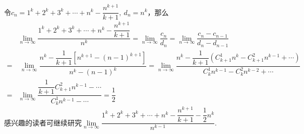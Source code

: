 \begin{itemize}[leftmargin=\inteval{\myitemleftmargin}pt,itemsep=
   \inteval{\myitemitempsep}pt,topsep=\inteval{\myitemtopsep}pt]
令$ c_n=1^k+2^k+3^k+\cdots +n^k-\dfrac{n^{k+1}}{k+1},\ d_n=n^{k} $，那么
\begin{align*}
    & \lim_{n\to \infty}\dfrac{1^k+2^k+3^k+\cdots +n^k-\dfrac{n^{k+1}}{k+1}}{n^{k}} =
    \lim_{n\to \infty}\dfrac{c_n}{d_n}=
    \lim_{n\to \infty}\dfrac{c_n-c_{n-1}}{d_n-d_{n-1}} \\
    =&\ \lim_{n\to \infty}\dfrac{n^k-\dfrac{1}{k+1}\left[n^{k+1}-(n-1)^{k+1} \right] }{n^{k}-(n-1)^{k}} 
    =\lim_{n\to \infty}\dfrac{n^k-\dfrac{1}{k+1}\left(C_{k+1}^1 n^k-C_{k+1}^2 n^{k-1}+
        \cdots \right) }{C_{k}^1 n^{k-1}-C_{k}^2 n^{k-2}+ \cdots} \\
    = &\lim_{n\to \infty}\dfrac{\dfrac{1}{k+1}C_{k+1}^2 n^{k-1}- \cdots}
    {C_{k}^1 n^{k-1} - \cdots} = \dfrac{1}{2}      
\end{align*}
感兴趣的读者可继续研究$ \lim\limits_{n\to \infty}\dfrac{1^k+2^k+3^k+\cdots +n^k-\dfrac{n^{k+1}}{k+1}-\dfrac{1}{2}n^k}{n^{k-1}} $.


\end{itemize}
